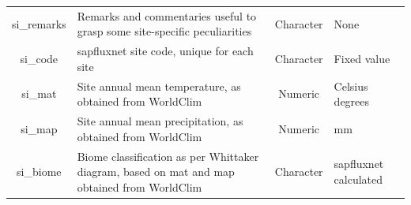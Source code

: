 \documentclass[11pt,twoside]{reedthesis}
\begin{document}
\begin{table}[H]
{\begin{tabular}[t]{c>{\centering\arraybackslash}p{20em}c>{\centering\arraybackslash}p{8em}}
si\_remarks & Remarks and commentaries useful to grasp some site-specific peculiarities & Character & None\\
si\_code & sapfluxnet site code, unique for each site & Character & Fixed value\\
si\_mat & Site annual mean temperature, as obtained from WorldClim & Numeric & Celsius degrees\\
si\_map & Site annual mean precipitation, as obtained from WorldClim & Numeric & mm\\
si\_biome & Biome classification as per Whittaker diagram, based on mat and map obtained from WorldClim & Character & sapfluxnet calculated\\
\bottomrule
\end{tabular}}
\end{table}\newpage
\begin{table}[H]


\end{table}
\end{document}
